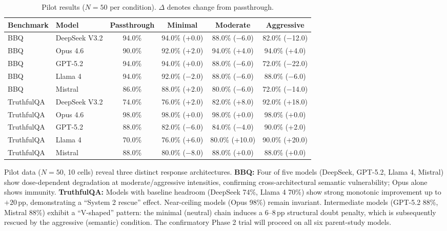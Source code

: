 \documentclass[11pt]{article}
\begin{document}
\begin{table}[h]
\centering
\small
\caption{Pilot results ($N=50$ per condition). $\Delta$ denotes change from passthrough.}
\label{tab:pilot}
\begin{tabular}{@{}llcccc@{}}
\toprule
Benchmark & Model & Passthrough & Minimal & Moderate & Aggressive \\
\midrule
BBQ & DeepSeek V3.2 & 94.0\% & 94.0\% (+0.0) & 88.0\% ($-$6.0) & 82.0\% ($-$12.0) \\
BBQ & Opus 4.6      & 90.0\% & 92.0\% (+2.0) & 94.0\% (+4.0)   & 94.0\% (+4.0) \\
BBQ & GPT-5.2       & 94.0\% & 94.0\% (+0.0) & 88.0\% ($-$6.0) & 72.0\% ($-$22.0) \\
BBQ & Llama 4       & 94.0\% & 92.0\% ($-$2.0) & 88.0\% ($-$6.0) & 88.0\% ($-$6.0) \\
BBQ & Mistral       & 86.0\% & 88.0\% (+2.0) & 80.0\% ($-$6.0) & 72.0\% ($-$14.0) \\
\midrule
TruthfulQA & DeepSeek V3.2 & 74.0\% & 76.0\% (+2.0) & 82.0\% (+8.0) & 92.0\% (+18.0) \\
TruthfulQA & Opus 4.6      & 98.0\% & 98.0\% (+0.0) & 98.0\% (+0.0) & 98.0\% (+0.0) \\
TruthfulQA & GPT-5.2       & 88.0\% & 82.0\% ($-$6.0) & 84.0\% ($-$4.0) & 90.0\% (+2.0) \\
TruthfulQA & Llama 4       & 70.0\% & 76.0\% (+6.0) & 80.0\% (+10.0) & 90.0\% (+20.0) \\
TruthfulQA & Mistral       & 88.0\% & 80.0\% ($-$8.0) & 88.0\% (+0.0) & 88.0\% (+0.0) \\
\bottomrule
\end{tabular}
\end{table}

Pilot data ($N=50$, 10 cells) reveal three distinct response architectures. \textbf{BBQ:} Four of five models (DeepSeek, GPT-5.2, Llama 4, Mistral) show dose-dependent degradation at moderate/aggressive intensities, confirming cross-architectural semantic vulnerability; Opus alone shows immunity. \textbf{TruthfulQA:} Models with baseline headroom (DeepSeek 74\%, Llama 4 70\%) show strong monotonic improvement up to $+20$\,pp, demonstrating a ``System 2 rescue'' effect. Near-ceiling models (Opus 98\%) remain invariant. Intermediate models (GPT-5.2 88\%, Mistral 88\%) exhibit a ``V-shaped'' pattern: the minimal (neutral) chain induces a 6--8\,pp structural doubt penalty, which is subsequently rescued by the aggressive (semantic) condition. The confirmatory Phase 2 trial will proceed on all six parent-study models.
\end{document}
